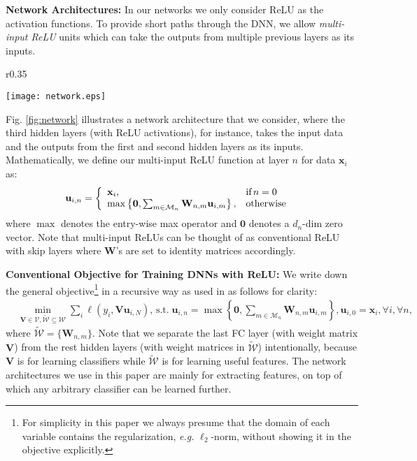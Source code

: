 \documentclass{article}
\def\eg{\emph{e.g. }}
\begin{document}
	{\bf Network Architectures:} In our networks we only consider ReLU as the activation functions.  To provide short paths through the DNN, we allow {\em multi-input ReLU} units which can take the outputs from multiple previous layers as its inputs. 
    
    \begin{wrapfigure}{r}{0.35\linewidth} 
		\vspace{-27pt}
		\begin{center}
			\texttt{[image: network.eps]}\vspace{-10pt}
			\caption{\footnotesize Illustration of DNN architectures that we consider in the paper.}
			\label{fig:network}
		\end{center}
		\vspace{-15pt}
	\end{wrapfigure}
    Fig. \ref{fig:network} illustrates a network architecture that we consider, where the third hidden layers (with ReLU activations), for instance, takes the input data and the outputs from the first and second hidden layers as its inputs. Mathematically, we define our multi-input ReLU function at layer $n$ for data $\mathbf{x}_i$ as:
	\begin{align}\label{eqn:mir}
	\hspace{-2mm}\mathbf{u}_{i,n} = \left\{
	\begin{array}{ll}
	\mathbf{x}_i, & \mbox{if} \, n=0 \\
	\max\left\{\mathbf{0}, \sum_{m\in\mathcal{M}_n}\mathbf{W}_{n,m}\mathbf{u}_{i,m}\right\}, & \mbox{otherwise}
	\end{array}
	\right.
	\end{align}
	where $\max$ denotes the entry-wise max operator and $\mathbf{0}$ denotes a $d_n$-dim zero vector. Note that multi-input ReLUs can be thought of as conventional ReLU with skip layers \cite{he2016deep} where $\mathbf{W}$'s are set to identity matrices accordingly. 
    
    
    {\bf Conventional Objective for Training DNNs with ReLU:} We write down the general objective\footnote{For simplicity in this paper we always presume that the domain of each variable contains the regularization, \eg $\ell_2$-norm, without showing it in the objective explicitly.} in a recursive way as used in \cite{Zhang_2016_CVPR} as follows for clarity:	
	\begin{align}\label{eqn:obj}
	& \min_{\mathbf{V}\in\mathcal{V}, \tilde{\mathcal{W}}\subseteq\mathcal{W}} \sum_i\ell(y_i, \mathbf{V}\mathbf{u}_{i,N}), \, \mbox{s.t.} \; \mathbf{u}_{i,n} = \max\left\{\mathbf{0}, \sum_{m\in\mathcal{M}_n}\mathbf{W}_{n,m}\mathbf{u}_{i,m}\right\}, \mathbf{u}_{i,0}=\mathbf{x}_i, 
	\forall i, \forall n,
	\end{align}
	where $\tilde{\mathcal{W}}=\{\mathbf{W}_{n,m}\}$. Note that we separate the last FC layer (with weight matrix $\mathbf{V}$) from the rest hidden layers (with weight matrices in $\tilde{\mathcal{W}}$) intentionally, because $\mathbf{V}$ is for learning classifiers while $\tilde{\mathcal{W}}$ is for learning useful features. The network architectures we use in this paper are mainly for extracting features, on top of which any arbitrary classifier can be learned further.
    
\end{document}
